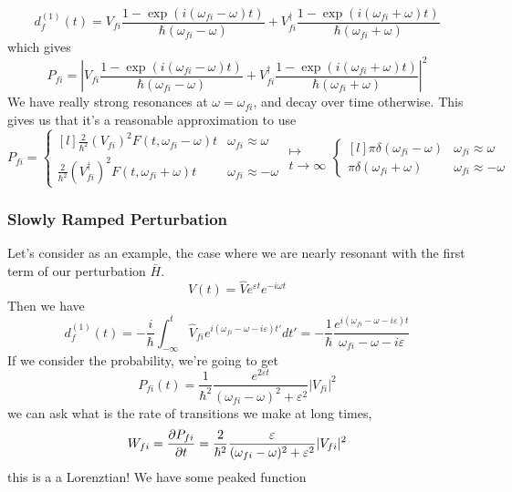 \documentclass{article}
\theoremstyle{definition}
\begin{document}
\begin{equation} d_f^{(1)}(t)=V_{fi}\frac{1-\exp(i(\omega_{fi}-\omega)t)}{\hbar(\omega_{fi}-\omega)} +V_{fi}^\dag\frac{1-\exp(i(\omega_{fi}+\omega)t)}{\hbar(\omega_{fi}+\omega)} \end{equation} which gives \begin{equation} P_{fi}= \left| V_{fi}\frac{1-\exp(i(\omega_{fi}-\omega)t)}{\hbar(\omega_{fi}-\omega)} +V_{fi}^\dag\frac{1-\exp(i(\omega_{fi}+\omega)t)}{\hbar(\omega_{fi}+\omega)} \right|^2 \end{equation} We have really strong resonances at $\omega=\omega_{fi}$, and decay over time otherwise. This gives us that it's a reasonable approximation to use \begin{equation} P_{fi}=\left\{\begin{matrix*}[l] \frac{2}{\hbar^2}(V_{fi})^2F(t,\omega_{fi}-\omega)t & \omega_{fi}\approx\omega\\ \frac{2}{\hbar^2}(V_{fi}^\dag)^2F(t,\omega_{fi}+\omega)t & \omega_{fi}\approx-\omega \end{matrix*}\right. \substack{\longmapsto\\t\rightarrow\infty} \left\{\begin{matrix*}[l] \pi\delta(\omega_{fi}-\omega) & \omega_{fi}\approx\omega\\ \pi\delta(\omega_{fi}+\omega) & \omega_{fi}\approx-\omega \end{matrix*}\right. \end{equation} \subsubsection{Slowly Ramped Perturbation} Let's consider as an example, the case where we are nearly resonant with the first term of our perturbation $\bar H$. \begin{equation} V(t)=\hat Ve^{\varepsilon t}e^{-i\omega t} \end{equation} Then we have \begin{equation} d_f^{(1)}(t)=-\frac{i}{\hbar}\int_{-\infty}^{t}\hat V_{fi}e^{i(\omega_{fi}-\omega-i\varepsilon)t'}dt' =-\frac{1}{\hbar}\frac{e^{i(\omega_{fi}-\omega-i\varepsilon)t}}{\omega_{fi}-\omega-i\varepsilon} \end{equation} If we consider the probability, we're going to get \begin{equation} P_{fi}(t)=\frac{1}{\hbar^2}\frac{e^{2\varepsilon t}}{(\omega_{fi}-\omega)^2+\varepsilon^2}|V_{fi}|^2 \end{equation} we can ask what is the rate of transitions we make at long times, \begin{equation} W_{fi}=\pdv{P_{fi}}{t}=\frac{2}{\hbar^2}\frac{\varepsilon}{(\omega_{fi}-\omega)^2+\varepsilon^2}|V_{fi}|^2 \end{equation} this is a a Lorenztian! We have some peaked function \begin{center}  \end{center}
\end{document}
